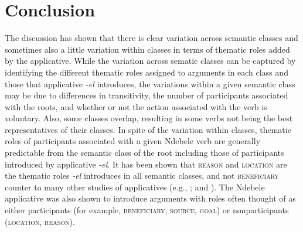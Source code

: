 \documentclass[output=paper]{langsci/langscibook}
\begin{document}
\section{Conclusion}\label{sec:sibanda:}

The discussion has shown that there is clear variation across semantic classes and sometimes also a little variation within classes in terms of thematic roles added by the applicative. While the variation across sematic classes can be captured by identifying the different thematic roles assigned to arguments in each class and those that applicative \textit{-el} introduces, the variations within a given semantic class may be due to differences in transitivity, the number of participants associated with the roots, and whether or not the action associated with the verb is voluntary. Also, some classes overlap, resulting in some verbs not being the best representatives of their classes. In spite of the variation within classes, thematic roles of participants associated with a given Ndebele verb are generally predictable from the semantic class of the root including those of participants introduced by applicative \textit{-el}. It has been shown that \textsc{reason} and \textsc{location} are the thematic roles \textit{-el} introduces in all semantic classes, and not \textsc{beneficiary} counter to many other studies of applicatives (e.g., \citealt{Schadeberg2003,Peterson2007,Polinsky2008,KiittilaZuniga2010,deKindBostoen2012}; and \citealt{MartenKula2014}). The Ndebele applicative was also shown to introduce arguments with roles often thought of as either participants (for example, \textsc{beneficiary}, \textsc{source}, \textsc{goal}) or nonparticipants (\textsc{location}, \textsc{reason}). 
\end{document}
